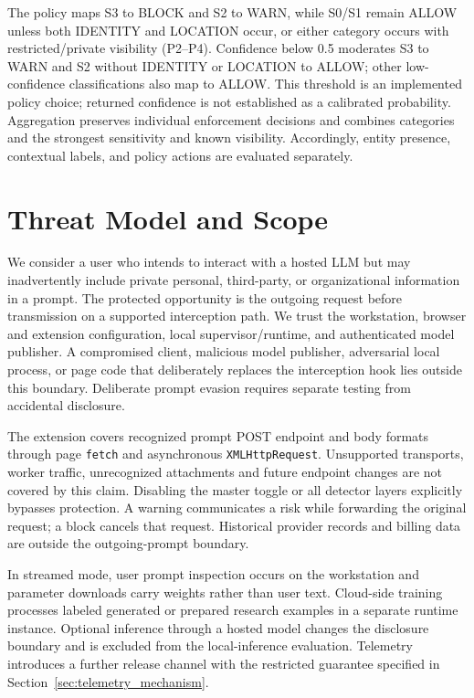 \documentclass[conference]{IEEEtran}
\begin{document}
The policy maps S3 to BLOCK and S2 to WARN, while S0/S1 remain ALLOW unless both IDENTITY and LOCATION occur, or either category occurs with restricted/private visibility (P2--P4). Confidence below 0.5 moderates S3 to WARN and S2 without IDENTITY or LOCATION to ALLOW; other low-confidence classifications also map to ALLOW. This threshold is an implemented policy choice; returned confidence is not established as a calibrated probability. Aggregation preserves individual enforcement decisions and combines categories and the strongest sensitivity and known visibility. Accordingly, entity presence, contextual labels, and policy actions are evaluated separately.

\vspace{\baselineskip}
\section{Threat Model and Scope}
\label{sec:threat_model}

We consider a user who intends to interact with a hosted LLM but may inadvertently include private personal, third-party, or organizational information in a prompt. The protected opportunity is the outgoing request before transmission on a supported interception path. We trust the workstation, browser and extension configuration, local supervisor/runtime, and authenticated model publisher. A compromised client, malicious model publisher, adversarial local process, or page code that deliberately replaces the interception hook lies outside this boundary. Deliberate prompt evasion requires separate testing from accidental disclosure.

The extension covers recognized prompt POST endpoint and body formats through page \texttt{fetch} and asynchronous \texttt{XMLHttpRequest}. Unsupported transports, worker traffic, unrecognized attachments and future endpoint changes are not covered by this claim. Disabling the master toggle or all detector layers explicitly bypasses protection. A warning communicates a risk while forwarding the original request; a block cancels that request. Historical provider records and billing data are outside the outgoing-prompt boundary.

In streamed mode, user prompt inspection occurs on the workstation and parameter downloads carry weights rather than user text. Cloud-side training processes labeled generated or prepared research examples in a separate runtime instance. Optional inference through a hosted model changes the disclosure boundary and is excluded from the local-inference evaluation. Telemetry introduces a further release channel with the restricted guarantee specified in Section~\ref{sec:telemetry_mechanism}.
\end{document}
